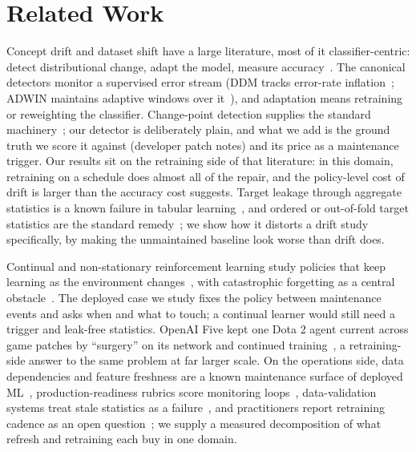 \documentclass[journal]{IEEEtran}
\begin{document}
\section{Related Work}
\label{sec:related}

Concept drift and dataset shift have a large literature, most of it
classifier-centric: detect distributional change, adapt the model,
measure accuracy~\cite{quinonero2009dataset,gama2014survey,lu2018learning}.
The canonical detectors monitor a supervised error stream (DDM tracks
error-rate inflation~\cite{gama2004ddm}; ADWIN maintains adaptive
windows over it~\cite{bifet2007adwin}), and adaptation means retraining
or reweighting the classifier. Change-point detection supplies the
standard machinery~\cite{aminikhanghahi2017survey}; our detector is
deliberately plain, and what we add is the ground truth we score it
against (developer patch notes) and its price as a maintenance trigger.
Our results sit on the retraining side of that literature: in this
domain, retraining on a schedule does almost all of the repair, and the
policy-level cost of drift is larger than the accuracy cost suggests.
Target leakage through aggregate statistics is a known failure in
tabular learning~\cite{kaufman2012leakage}, and ordered or out-of-fold
target statistics are the standard remedy~\cite{prokhorenkova2018catboost};
we show how it distorts a drift study specifically, by making the
unmaintained baseline look worse than drift does.

Continual and non-stationary reinforcement learning study policies that
keep learning as the environment changes~\cite{padakandla2021survey,
khetarpal2022continual}, with catastrophic forgetting as a central
obstacle~\cite{kirkpatrick2017ewc}. The deployed case we study fixes the
policy between maintenance events and asks when and what to touch; a
continual learner would still need a trigger and leak-free statistics. OpenAI Five kept one
Dota 2 agent current across game patches by ``surgery'' on its network
and continued training~\cite{berner2019dota}, a retraining-side answer
to the same problem at far larger scale. On the operations side, data
dependencies and feature freshness are a known maintenance surface of
deployed ML~\cite{sculley2015debt}, production-readiness rubrics score
monitoring loops~\cite{breck2017mltest}, data-validation systems treat
stale statistics as a failure~\cite{polyzotis2019data}, and practitioners
report retraining cadence as an open question~\cite{shankar2022operationalizing};
we supply a measured decomposition of what refresh and retraining each
buy in one domain.
\end{document}
